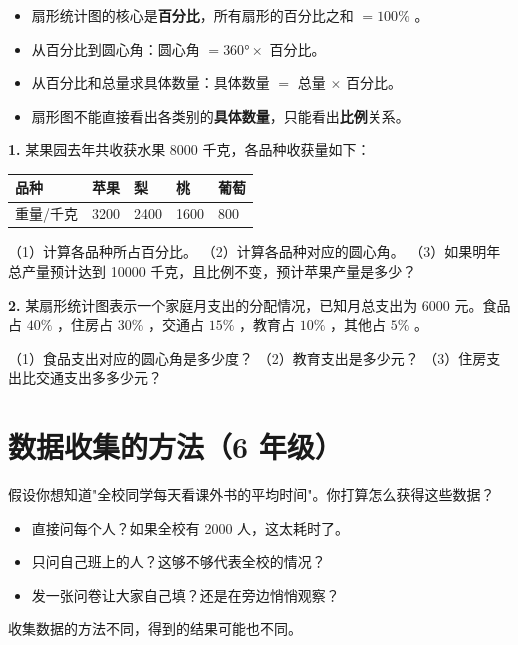\begin{keytakeaway}


\begin{itemize}
  \item 扇形统计图的核心是\textbf{百分比}，所有扇形的百分比之和 $= 100\%$ 。
  \item 从百分比到圆心角：圆心角 $= 360° \times$ 百分比。
  \item 从百分比和总量求具体数量：具体数量 $=$ 总量 $\times$ 百分比。
  \item 扇形图不能直接看出各类别的\textbf{具体数量}，只能看出\textbf{比例}关系。
\end{itemize}


\end{keytakeaway}

\begin{practice}


\textbf{1.} 某果园去年共收获水果 8000 千克，各品种收获量如下：

\begin{center}
\begin{tabular}{lllll}
\toprule
品种 & 苹果 & 梨 & 桃 & 葡萄 \\
\midrule
重量/千克 & 3200 & 2400 & 1600 & 800 \\
\bottomrule
\end{tabular}
\end{center}


（1）计算各品种所占百分比。
（2）计算各品种对应的圆心角。
（3）如果明年总产量预计达到 10000 千克，且比例不变，预计苹果产量是多少？

\textbf{2.} 某扇形统计图表示一个家庭月支出的分配情况，已知月总支出为 6000 元。食品占 $40\%$ ，住房占 $30\%$ ，交通占 $15\%$ ，教育占 $10\%$ ，其他占 $5\%$ 。

（1）食品支出对应的圆心角是多少度？
（2）教育支出是多少元？
（3）住房支出比交通支出多多少元？

\end{practice}



\section*{数据收集的方法（6 年级）}


\begin{explore}


假设你想知道"全校同学每天看课外书的平均时间"。你打算怎么获得这些数据？

\begin{itemize}
  \item 直接问每个人？如果全校有 2000 人，这太耗时了。
  \item 只问自己班上的人？这够不够代表全校的情况？
  \item 发一张问卷让大家自己填？还是在旁边悄悄观察？
\end{itemize}


收集数据的方法不同，得到的结果可能也不同。

\end{explore}

